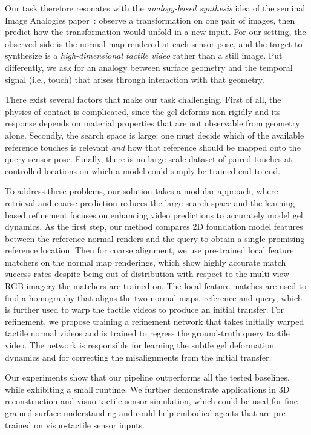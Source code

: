 Our task therefore resonates with the \emph{analogy-based synthesis} idea of the seminal Image
Analogies paper~\cite{imageanalogies}: observe a transformation on one pair of images, then predict how the transformation would unfold in a new input. 
For our setting, the observed side is the normal map rendered at each sensor pose, and the target to synthesize 
is a \emph{high-dimensional tactile video} rather than a still image. 
Put differently, we ask for an analogy between surface geometry and the temporal signal (i.e., touch) that arises through interaction with that geometry.

There exist several factors that make our task challenging.
First of all, the physics of contact is complicated, since the gel deforms
non-rigidly and its response depends on material properties that are not observable from geometry
alone.
Secondly, the search space is large: one must decide which of the available reference touches is relevant 
\emph{and} how that reference should be mapped onto the query sensor pose.
Finally, there is no large-scale dataset of paired touches at controlled locations on which a model could simply be
trained end-to-end.

To address these problems, our solution takes a modular approach, where retrieval and coarse prediction reduces the large search space 
and the learning-based refinement focuses on enhancing video predictions to accurately model gel dynamics.
As the first step, our method compares 2D foundation model features~\cite{dinov3} between the reference 
normal renders and the query to obtain a single promising reference location.
Then for coarse alignment, we use pre-trained local feature matchers on the
normal map renderings, which show highly accurate match success rates despite being out of
distribution with respect to the multi-view RGB imagery the matchers are trained on. The local
feature matches are used to find a homography that aligns the two normal maps, reference and
query, which is further used to warp the tactile videos to produce an initial transfer. For
refinement, we propose training a refinement network that takes initially warped tactile normal
videos and is trained to regress the ground-truth query tactile video. The network is responsible
for learning the subtle gel deformation dynamics and for correcting the misalignments from the
initial transfer.

Our experiments show that our pipeline outperforms all the tested baselines, while exhibiting a
small runtime. We further demonstrate applications in 3D reconstruction and visuo-tactile sensor
simulation, which could be used for fine-grained surface understanding and could help embodied
agents that are pre-trained on visuo-tactile sensor inputs.

